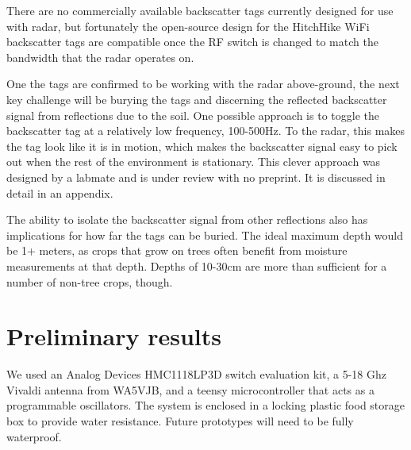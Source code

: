 \documentclass[12pt]{article}
\begin{document}
There are no commercially available backscatter tags currently
designed for use with radar, but fortunately the open-source design
for the HitchHike WiFi backscatter tags are compatible once the RF
switch is changed to match the bandwidth that the radar operates on.

One the tags are confirmed to be working with the radar above-ground,
the next key challenge will be burying the tags and discerning the
reflected backscatter signal from reflections due to the soil. One
possible approach is to toggle the backscatter tag at a relatively low
frequency, 100-500Hz. To the radar, this makes the tag look like it is
in motion, which makes the backscatter signal easy to pick out when
the rest of the environment is stationary. This clever approach was
designed by a labmate and is under review with no preprint. It is
discussed in detail in an appendix.

The ability to isolate the backscatter signal from other reflections
also has implications for how far the tags can be buried. The ideal
maximum depth would be 1+ meters, as crops that grow on trees often
benefit from moisture measurements at that depth. Depths of 10-30cm
are more than sufficient for a number of non-tree crops, though.



\section*{Preliminary results} 

We used an Analog Devices HMC1118LP3D switch evaluation kit, a 5-18
Ghz Vivaldi antenna from WA5VJB, and a teensy microcontroller that
acts as a programmable oscillators. The system is enclosed in a
locking plastic food storage box to provide water resistance. Future
prototypes will need to be fully waterproof.
\end{document}
